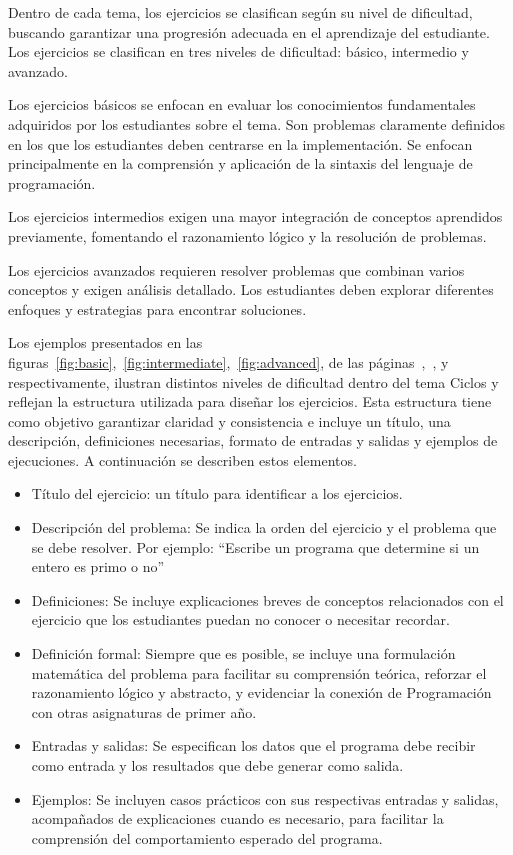 Dentro de cada tema, los ejercicios se clasifican según su nivel de dificultad, buscando garantizar una progresión adecuada en el aprendizaje del estudiante. Los ejercicios se clasifican en tres niveles de dificultad: básico, intermedio y avanzado.

Los ejercicios básicos se enfocan en evaluar los conocimientos fundamentales adquiridos por los estudiantes sobre el tema. Son problemas claramente definidos en los que los estudiantes deben centrarse en la implementación. Se enfocan principalmente en la comprensión y aplicación de la sintaxis del lenguaje de programación.

Los ejercicios intermedios exigen una mayor integración de conceptos aprendidos previamente, fomentando el razonamiento lógico y la resolución de problemas.

Los ejercicios avanzados requieren resolver problemas que combinan varios conceptos y exigen análisis detallado. Los estudiantes deben explorar diferentes enfoques y estrategias para encontrar soluciones.

Los ejemplos presentados en las figuras~\ref{fig:basic},~\ref{fig:intermediate},~\ref{fig:advanced}, de las páginas~\pageref{fig:basic},~\pageref{fig:intermediate}, y~\pageref{fig:advanced} respectivamente, ilustran distintos niveles de dificultad dentro del tema Ciclos y reflejan la estructura utilizada para diseñar los ejercicios. Esta estructura tiene como objetivo garantizar claridad y consistencia e incluye un título, una descripción, definiciones necesarias, formato de entradas y salidas y ejemplos de ejecuciones. A continuación se describen estos elementos.

\begin{itemize}
    \item Título del ejercicio: un título para identificar a los ejercicios.
    
    \item Descripción del problema:  
    Se indica la orden del ejercicio y el problema que se debe resolver. Por ejemplo: ``Escribe un programa que determine si un entero es primo o no''

    \item Definiciones: 
    Se incluye explicaciones breves de conceptos relacionados con el ejercicio que los estudiantes puedan no conocer o necesitar recordar.

    \item Definición formal:
    Siempre que es posible, se incluye una formulación matemática del problema para facilitar su comprensión teórica, reforzar el razonamiento lógico y abstracto, y evidenciar la conexión de Programación con otras asignaturas de primer año.
    
    \item Entradas y salidas:
    Se especifican los datos que el programa debe recibir como entrada y los resultados que debe generar como salida.

    \item Ejemplos:
    Se incluyen casos prácticos con sus respectivas entradas y salidas, acompañados de explicaciones cuando es necesario, para facilitar la comprensión del comportamiento esperado del programa.
\end{itemize}

